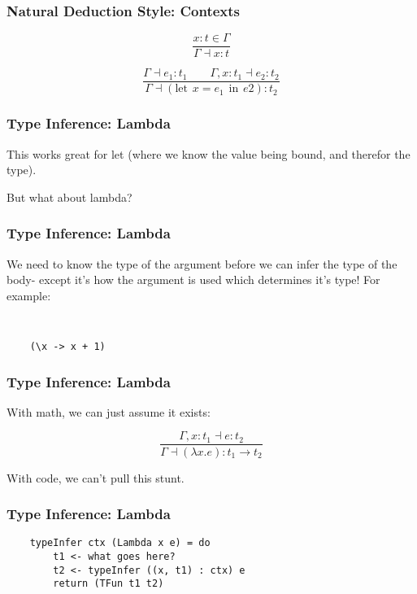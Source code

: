 \documentclass{beamer}
\begin{document}
\begin{frame}
\frametitle{Natural Deduction Style: Contexts}
\LARGE{
$$\frac{x:t \in{} \Gamma}{\Gamma{}\dashv{}x:t}$$

\vspace{20pt}

$$\frac{\Gamma\dashv{}e_1:t_1\qquad{}\Gamma{},x:t_1\dashv{}e_2:t_2}{\Gamma\dashv{}(\text{let}\hspace{5pt}x=e_1\hspace{5pt}\text{in}\hspace{5pt}e2):t_2}$$
}
\end{frame}

\begin{frame}
\frametitle{Type Inference: Lambda}
\begin{center}
\Large{
This works great for let (where we know the value being bound, and therefor
the type).

\vspace{20pt}

But what about lambda?}
\end{center}
\end{frame}

\begin{frame}[fragile]
\frametitle{Type Inference: Lambda}
\Large{
We need to know the type of the argument before we can infer the
type of the body- except it's how the argument is used which
determines it's type!  For example:

\tt
\begin{verbatim}
    (\x -> x + 1)
\end{verbatim}
}
\end{frame}

\begin{frame}
\frametitle{Type Inference: Lambda}

\Large{
With math, we can just assume it exists:

$$\frac{\Gamma,x:t_1\dashv{}e:t_2}{\Gamma\dashv{}(\lambda{}x.e):t_1 \rightarrow{} t_2}$$

\vspace{20pt}

With code, we can't pull this stunt.
}
\end{frame}

\begin{frame}[fragile]
\frametitle{Type Inference: Lambda}

{\tt\Large{
\begin{verbatim}
    typeInfer ctx (Lambda x e) = do
        t1 <- what goes here?
        t2 <- typeInfer ((x, t1) : ctx) e
        return (TFun t1 t2)
\end{verbatim}
}}
\end{frame}
\end{document}
